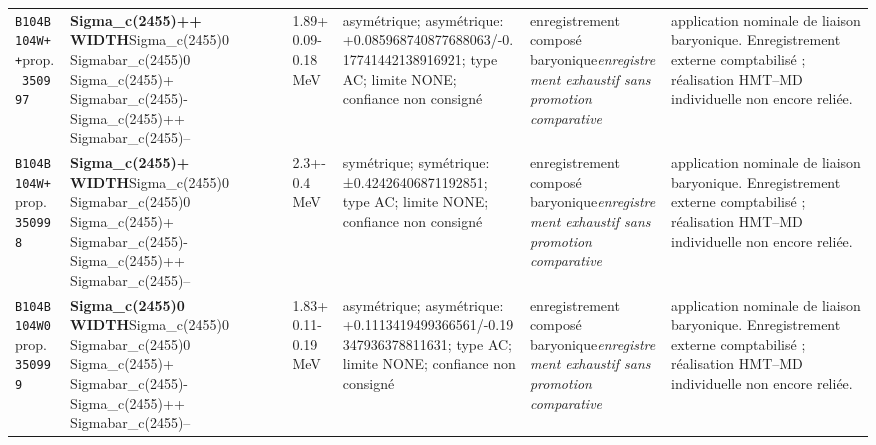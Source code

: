 \begin{landscape}
\begin{longtable}{L{1.85cm}L{4.45cm}L{2.35cm}L{4.05cm}L{3.35cm}L{7.15cm}}
\texttt{B104}\newline \texttt{B104W++}\newline prop.\ \texttt{350997} & \textbf{Sigma\_\allowbreak{}c(2455)++ WIDTH}\newline Sigma\_\allowbreak{}c(2455)0 \textbar{}\allowbreak{} Sigmabar\_\allowbreak{}c(2455)0 \textbar{}\allowbreak{} Sigma\_\allowbreak{}c(2455)+ \textbar{}\allowbreak{} Sigmabar\_\allowbreak{}c(2455)- \textbar{}\allowbreak{} Sigma\_\allowbreak{}c(2455)++ \textbar{}\allowbreak{} Sigmabar\_\allowbreak{}c(2455)-- & 1.89+0.09-0.18\,MeV & asymétrique; asymétrique: +0.085968740877688063/-0.17741442138916921; type AC; limite NONE; confiance non consigné & enregistrement composé baryonique\newline \emph{enregistrement exhaustif sans promotion comparative} & application nominale de liaison baryonique. Enregistrement externe comptabilisé ; réalisation HMT--MD individuelle non encore reliée. \\
\texttt{B104}\newline \texttt{B104W+}\newline prop.\ \texttt{350998} & \textbf{Sigma\_\allowbreak{}c(2455)+ WIDTH}\newline Sigma\_\allowbreak{}c(2455)0 \textbar{}\allowbreak{} Sigmabar\_\allowbreak{}c(2455)0 \textbar{}\allowbreak{} Sigma\_\allowbreak{}c(2455)+ \textbar{}\allowbreak{} Sigmabar\_\allowbreak{}c(2455)- \textbar{}\allowbreak{} Sigma\_\allowbreak{}c(2455)++ \textbar{}\allowbreak{} Sigmabar\_\allowbreak{}c(2455)-- & 2.3+-0.4\,MeV & symétrique; symétrique: ±0.42426406871192851; type AC; limite NONE; confiance non consigné & enregistrement composé baryonique\newline \emph{enregistrement exhaustif sans promotion comparative} & application nominale de liaison baryonique. Enregistrement externe comptabilisé ; réalisation HMT--MD individuelle non encore reliée. \\
\texttt{B104}\newline \texttt{B104W0}\newline prop.\ \texttt{350999} & \textbf{Sigma\_\allowbreak{}c(2455)0 WIDTH}\newline Sigma\_\allowbreak{}c(2455)0 \textbar{}\allowbreak{} Sigmabar\_\allowbreak{}c(2455)0 \textbar{}\allowbreak{} Sigma\_\allowbreak{}c(2455)+ \textbar{}\allowbreak{} Sigmabar\_\allowbreak{}c(2455)- \textbar{}\allowbreak{} Sigma\_\allowbreak{}c(2455)++ \textbar{}\allowbreak{} Sigmabar\_\allowbreak{}c(2455)-- & 1.83+0.11-0.19\,MeV & asymétrique; asymétrique: +0.1113419499366561/-0.19347936378811631; type AC; limite NONE; confiance non consigné & enregistrement composé baryonique\newline \emph{enregistrement exhaustif sans promotion comparative} & application nominale de liaison baryonique. Enregistrement externe comptabilisé ; réalisation HMT--MD individuelle non encore reliée. \\

\end{longtable}
\end{landscape}
